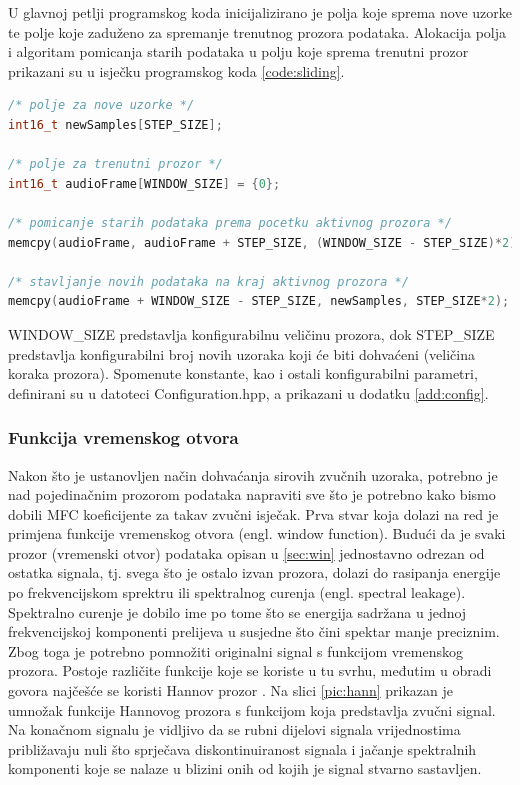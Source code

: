 U glavnoj petlji programskog koda inicijalizirano je polja koje sprema nove uzorke te 
polje koje zaduženo za spremanje trenutnog prozora podataka. Alokacija polja i algoritam
pomicanja starih podataka u polju koje sprema trenutni prozor prikazani su u isječku programskog
koda \ref{code:sliding}.

\begin{lstlisting}[language=C++, caption=Algoritam za korištenje novodohvaćenih podataka, label=code:sliding]
/* polje za nove uzorke */
int16_t newSamples[STEP_SIZE];

/* polje za trenutni prozor */
int16_t audioFrame[WINDOW_SIZE] = {0};

/* pomicanje starih podataka prema pocetku aktivnog prozora */
memcpy(audioFrame, audioFrame + STEP_SIZE, (WINDOW_SIZE - STEP_SIZE)*2);

/* stavljanje novih podataka na kraj aktivnog prozora */
memcpy(audioFrame + WINDOW_SIZE - STEP_SIZE, newSamples, STEP_SIZE*2);
\end{lstlisting}

WINDOW\_SIZE predstavlja konfigurabilnu veličinu prozora, dok STEP\_SIZE predstavlja 
konfigurabilni broj novih uzoraka koji će biti dohvaćeni (veličina koraka prozora).
Spomenute konstante, kao i ostali konfigurabilni parametri, definirani su u 
datoteci Configuration.hpp, a prikazani u dodatku \ref{add:config}.

\subsubsection{Funkcija vremenskog otvora}
Nakon što je ustanovljen način dohvaćanja sirovih zvučnih uzoraka, potrebno je
nad pojedinačnim prozorom podataka napraviti sve što je potrebno kako bismo
dobili MFC koeficijente za takav zvučni isječak. Prva stvar koja dolazi na red 
je primjena funkcije vremenskog otvora (engl. window function). Budući da je svaki
prozor (vremenski otvor) podataka opisan u \ref{sec:win} jednostavno odrezan od ostatka
signala, tj. svega što je ostalo izvan prozora, dolazi do rasipanja energije po
frekvencijskom sprektru ili spektralnog curenja (engl. spectral leakage). Spektralno curenje
je dobilo ime po tome što se energija sadržana u jednoj frekvencijskoj komponenti prelijeva
u susjedne što čini spektar manje preciznim.
Zbog toga je potrebno pomnožiti originalni signal s funkcijom vremenskog prozora. Postoje
različite funkcije koje se koriste u tu svrhu, međutim u obradi govora najčešće se koristi
Hannov prozor \cite{windowing}.
Na slici \ref{pic:hann} prikazan je umnožak funkcije Hannovog prozora s funkcijom
koja predstavlja zvučni signal. Na konačnom signalu je vidljivo da se rubni dijelovi
signala vrijednostima približavaju nuli što sprječava diskontinuiranost signala i jačanje
spektralnih komponenti koje se nalaze u blizini onih od kojih je signal stvarno sastavljen.

